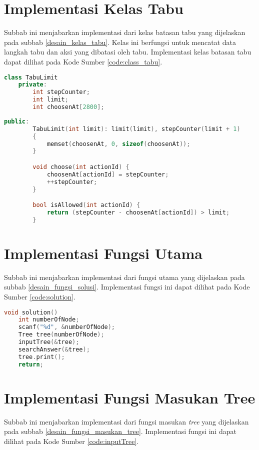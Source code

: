 \section{Implementasi Kelas Tabu}
Subbab ini menjabarkan implementasi dari kelas batasan tabu yang dijelaskan pada subbab \ref{desain_kelas_tabu}. Kelas ini berfungsi untuk mencatat data langkah tabu dan aksi yang dibatasi oleh tabu. Implementasi kelas batasan tabu dapat dilihat pada Kode Sumber \ref{code:class_tabu}.

\begin{lstlisting}[language=C++, firstnumber=0]
	class TabuLimit
    private:
        int stepCounter;
        int limit;
        int choosenAt[2800];

\end{lstlisting}
\pagebreak
\begin{lstlisting}[language=C++, caption=Implementasi Kelas Batasan Tabu, label=code:class_tabu, firstnumber=6]
    public:
        TabuLimit(int limit): limit(limit), stepCounter(limit + 1)
        {
            memset(choosenAt, 0, sizeof(choosenAt));
        }

        void choose(int actionId) {
            choosenAt[actionId] = stepCounter;
            ++stepCounter;
        }

        bool isAllowed(int actionId) {
            return (stepCounter - choosenAt[actionId]) > limit;
        }
\end{lstlisting}

\section{Implementasi Fungsi Utama}
Subbab ini menjabarkan implementasi dari fungsi utama yang dijelaskan pada subbab \ref{desain_fungsi_solusi}. Implementasi fungsi ini dapat dilihat pada Kode Sumber \ref{code:solution}.

\begin{lstlisting}[language=C++, caption=Implementasi Fungsi Utama, label=code:solution, firstnumber=0]
	void solution()
	int numberOfNode;
	scanf("%d", &numberOfNode);
	Tree tree(numberOfNode);
	inputTree(&tree);
	searchAnswer(&tree);
	tree.print();
	return;
\end{lstlisting}

\section{Implementasi Fungsi Masukan Tree}
Subbab ini menjabarkan implementasi dari fungsi masukan \textit{tree} yang dijelaskan pada subbab \ref{desain_fungsi_masukan_tree}. Implementasi fungsi ini dapat dilihat pada Kode Sumber \ref{code:inputTree}.


